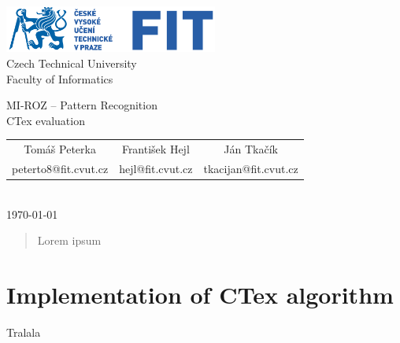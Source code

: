 \documentclass[fleqn,numbers=noenddot,headinclude,%
				11pt,a4paper,footinclude,%
				cleardoublepage=empty,abstractoff %
                ]{scrartcl}
\def\tomas{Tom\'{a}\v{s} Peterka}
\def\tomasid{peterto8}
\def\franta{Franti\v{s}ek Hejl}
\def\frantaid{hejl}
\def\jan{J\'{a}n Tka\v{c}\'{i}k}
\def\janid{tkacijan}
\def\frantaid{hejl}
\def\laboratoryname{CTex evaluation}
\def\date{\today}
\begin{document}
\pagestyle{empty}
\onecolumn
\null  %
\nointerlineskip  %
\vspace*{-1cm}
\begin{center}

\includegraphics[width=7cm,keepaspectratio=true]{./imgs/fit_logo.pdf}\\[0.3cm]
Czech Technical University\\
Faculty of Informatics

\vspace{1.2cm}

\Large MI-ROZ -- Pattern Recognition\\[0.5cm]
\laboratoryname \normalsize\\

\vspace{0.7cm}

\begin{tabular}{ccc}
\tomas & \franta & \jan \\
\tomasid @fit.cvut.cz & \frantaid @fit.cvut.cz & \janid @fit.cvut.cz \\
\end{tabular} \\[0.7cm]
\date
\end{center}
\vfill
\begin{abstract}
Lorem ipsum
\end{abstract}
\vfill
\tableofcontents

\clearpage

\pagestyle{scrheadings}
\setcounter{page}{1}

\section{Implementation of CTex algorithm}
Tralala

%
\end{document}
